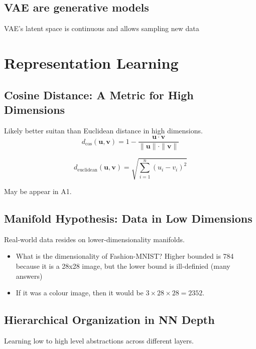 \subsection{VAE are generative models}
\begin{definition}
    VAE's latent space is continuous and allows sampling new data
\end{definition}
\newpage

\section{Representation Learning}

\subsection{Cosine Distance: A Metric for High Dimensions}
\begin{definition}
    Likely better suitan than Euclidean distance in high dimensions.
    \[
    d_{\text{cos}}(\mathbf{u}, \mathbf{v}) = 1 - \frac{\mathbf{u} \cdot \mathbf{v}}{\|\mathbf{u}\| \cdot \|\mathbf{v}\|}
    \]

    \[
    d_{\text{euclidean}}(\mathbf{u}, \mathbf{v}) = \sqrt{\sum_{i=1}^n (u_i - v_i)^2}
    \]
\end{definition}

\begin{warning}
    May be appear in A1.
\end{warning}

\subsection{Manifold Hypothesis: Data in Low Dimensions}
\begin{notes}
    Real-world data resides on lower-dimensionality manifolds.
    \begin{itemize}
        \item What is the dimensionality of Fashion-MNIST? Higher bounded is 784 because it is a 28x28 image, but the lower bound is ill-definied (many answers)
        \item If it was a colour image, then it would be $3 \times 28 \times 28 = 2352$.
    \end{itemize}
\end{notes}

\subsection{Hierarchical Organization in NN Depth}
\begin{notes}
    Learning low to high level abstractions across different layers.
\end{notes}


